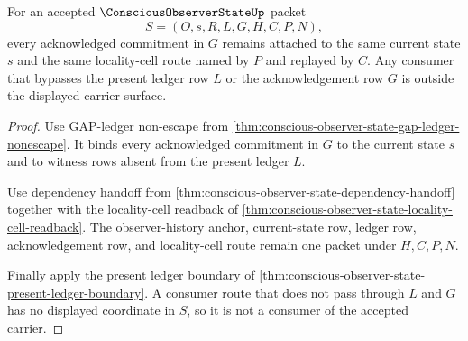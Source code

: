 \begin{theorem}
\label{thm:conscious-observer-state-gap-locality-exhaustion}
For an accepted $\ConsciousObserverStateUp$ packet
$$
S=(O,s,R,L,G,H,C,P,N),
$$
every acknowledged commitment in $G$ remains attached to the same current state $s$ and the same locality-cell route named by $P$ and replayed by $C$. Any consumer that bypasses the present ledger row $L$ or the acknowledgement row $G$ is outside the displayed carrier surface.
\end{theorem}
\begin{proof}
Use GAP-ledger non-escape from \autoref{thm:conscious-observer-state-gap-ledger-nonescape}. It binds every acknowledged commitment in $G$ to the current state $s$ and to witness rows absent from the present ledger $L$.

Use dependency handoff from \autoref{thm:conscious-observer-state-dependency-handoff} together with the locality-cell readback of \autoref{thm:conscious-observer-state-locality-cell-readback}. The observer-history anchor, current-state row, ledger row, acknowledgement row, and locality-cell route remain one packet under $H,C,P,N$.

Finally apply the present ledger boundary of \autoref{thm:conscious-observer-state-present-ledger-boundary}. A consumer route that does not pass through $L$ and $G$ has no displayed coordinate in $S$, so it is not a consumer of the accepted carrier.
\end{proof}

